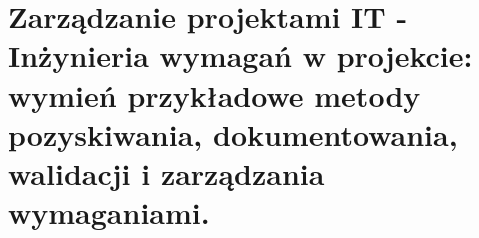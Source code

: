 \section{Zarządzanie projektami IT - Inżynieria wymagań w projekcie: wymień przykładowe metody pozyskiwania, dokumentowania, walidacji i zarządzania wymaganiami. }